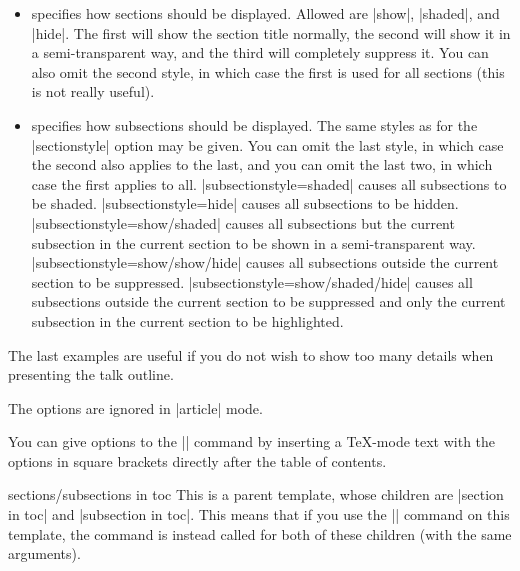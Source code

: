 \begin{command}{\tableofcontents{}}
\begin{itemize}
  \item
     specifies how sections should be displayed. Allowed  are |show|, |shaded|, and |hide|. The first will show the section title normally, the second will show it in a semi-transparent way, and the third will completely suppress it. You can also omit the second style, in which case the first is used for all sections (this is not really useful).
  \item
     specifies how subsections should be displayed. The same styles as for the |sectionstyle| option may be given. You can omit the last style, in which case the second also applies to the last, and you can omit the last two, in which case the first applies to all.
    \example
    |subsectionstyle=shaded| causes all subsections to be shaded.
    \example
    |subsectionstyle=hide| causes all subsections to be hidden.
    \example
    |subsectionstyle=show/shaded| causes all subsections but the current subsection in the current section to be shown in a semi-transparent way.
    \example
    |subsectionstyle=show/show/hide| causes all subsections outside the current section to be suppressed.
    \example
    |subsectionstyle=show/shaded/hide| causes all subsections outside the current section to be suppressed and only the current subsection in the current section to be highlighted.
  \end{itemize}

  The last examples are useful if you do not wish to show too many details when presenting the talk outline.

  \articlenote
  The options are ignored in |article| mode.

  \lyxnote
  You can give options to the |\tableofcontents| command by inserting a \TeX-mode text with the options in square brackets directly after the table of contents.

  \begin{element}{sections/subsections in toc}\semiyes\no\no
    This is a parent template, whose children are |section in toc| and |subsection in toc|. This means that if you use the |\setbeamertemplate| command on this template, the command is instead called for both of these children (with the same arguments).


\end{element}
\end{command}
